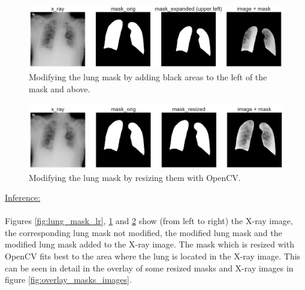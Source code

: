 \documentclass{article}
\begin{document}
\begin{figure}[h!]%
    \centering
    \includegraphics[width=1\linewidth]{lung_mask_report_ul.png}
    \caption{Modifying the lung mask by adding black areas to the left of the mask and above.}
    \label{fig:lung_mask_ul}
\end{figure}   


\begin{figure}[h!]%
    \centering
    \includegraphics[width=1\linewidth]{lung_mask_report_resize.png}
    \caption{Modifying the lung mask by resizing them with OpenCV.}
    \label{fig:lung_mask_resize}
\end{figure}   

\vspace{0.3cm}

\noindent \underline{Inference:}\\
\\
Figures \ref{fig:lung_mask_lr}, \ref{fig:lung_mask_ul} and \ref{fig:lung_mask_resize} show  (from left to right) the X-ray image, the corresponding lung mask not modified, the modified lung mask and the modified lung mask added to the X-ray image. The mask which is resized with OpenCV fits best to the area where the lung is located in the X-ray image. This can be seen in detail in the overlay of some resized masks and X-ray images in figure \ref{fig:overlay_masks_images}.

\vspace{0.3cm}
\end{document}
